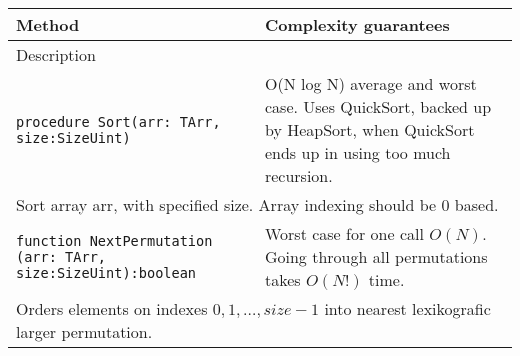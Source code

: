 \begin{longtable}{|m{10cm}|m{5cm}|}
\hline
Method & Complexity guarantees \\ \hline
\multicolumn{2}{|m{15cm}|}{Description} \\ \hline\hline

\verb!procedure Sort(arr: TArr, size:SizeUint)! &
O(N log N) average and worst case. Uses QuickSort, backed up by HeapSort, when QuickSort ends up in
using too much recursion.\\ \hline
\multicolumn{2}{|m{15cm}|}{Sort array arr, with specified size. Array indexing should be 0 based.} \\\hline\hline

\verb!function NextPermutation! \verb!(arr: TArr, size:SizeUint):boolean! &
Worst case for one call $O(N)$. Going through all permutations takes $O(N!)$ time.\\ \hline
\multicolumn{2}{|m{15cm}|}{Orders elements on indexes $0, 1, \dots, size-1$ into nearest
lexikografic larger permutation.} \\\hline


\end{longtable}
